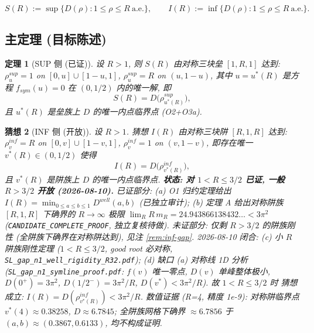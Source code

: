 \documentclass[UTF8]{ctexart}
\newtheorem{theorem}{定理}[section]
\newtheorem{conjecture}[theorem]{猜想}
\begin{document}
\begin{equation}
	S(R):=\sup\{D(\rho):1\le\rho\le R\ \text{a.e.}\},\qquad
	I(R):=\inf\{D(\rho):1\le\rho\le R\ \text{a.e.}\}.
\end{equation}

\subsection{主定理 (目标陈述)}
\begin{theorem}[SUP 侧 (已证)]
设 $R>1$, 则 $S(R)$ 由对称三块垒 $[1,R,1]$ 达到:
$\rho^{sup}_u = 1$ on $[0,u]\cup[1-u,1]$, $\rho^{sup}_u=R$ on $(u,1-u)$,
其中 $u=u^*(R)$ 是方程 $f_{sym}(u)=0$ 在 $(0,1/2)$ 内的唯一解, 即
\begin{equation}
	S(R)=D\bigl(\rho^{sup}_{u^*(R)}\bigr),
\end{equation}
且 $u^*(R)$ 是垒族上 $D$ 的唯一内点临界点 (O2+O3a).
\end{theorem}

\begin{conjecture}[INF 侧 (开放)]
设 $R>1$. 猜想 $I(R)$ 由对称三块阱 $[R,1,R]$ 达到:
$\rho^{inf}_v=R$ on $[0,v]\cup[1-v,1]$, $\rho^{inf}_v=1$ on $(v,1-v)$,
即存在唯一 $v^*(R)\in(0,1/2)$ 使得
\begin{equation}
	I(R)=D\bigl(\rho^{inf}_{v^*(R)}\bigr),
\end{equation}
且 $v^*(R)$ 是阱族上 $D$ 的唯一内点临界点.
\textbf{状态: 对 $1<R\le3/2$ 已证, 一般 $R>3/2$ 开放 (2026-08-10).} 已证部分: (a) O1 归约定理给出
$I(R)=\min_{0\le a\le b\le1}D^{well}(a,b)$ (已独立审计); (b) 定理 A 给出对称阱族
$[R,1,R]$ 下确界的 $R\to\infty$ 极限 $\lim_R R\,m_R=24.943866138432\ldots<3\pi^2$
(\texttt{CANDIDATE\_COMPLETE\_PROOF}, 独立复核待做). 未证部分: 仅剩 $R>3/2$ 的阱族刚性 (全阱族下确界在对称阱达到), 见注 \ref{rem:inf-gap}.
2026-08-10 闭合: (c) 小 $R$ 阱族刚性定理 ($1<R\le3/2$, good root 必对称,
\texttt{SL\_gap\_n1\_well\_rigidity\_R32.pdf}); (d) 缺口 (a) 对称线 1D 分析
(\texttt{SL\_gap\_n1\_symline\_proof.pdf}: $f(v)$ 唯一零点, $D(v)$ 单峰整体极小,
$D(0^+)=3\pi^2$, $D(1/2^-)=3\pi^2/R$, $D(v^*)<3\pi^2/R$). 故 $1<R\le3/2$ 时
猜想成立: $I(R)=D(\rho^{inf}_{v^*(R)})<3\pi^2/R$. 数值证据 (R=4, 精度 1e-9):
对称阱临界点 $v^*(4)\approx0.38258$, $D\approx6.7845$; 全阱族网格下确界
$\approx6.7856$ 于 $(a,b)\approx(0.3867,0.6133)$, 均不构成证明.
\end{conjecture}
\end{document}
